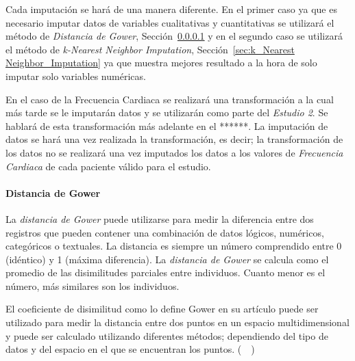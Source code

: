 Cada imputación se hará de una manera diferente. En el primer caso ya que es necesario imputar datos de variables cualitativas y cuantitativas se utilizará el método de \textit{Distancia de Gower}, Sección~\ref{sec:gower_distance} y en el segundo caso se utilizará el método de \textit{k-Nearest Neighbor Imputation}, Sección~\ref{sec:k_Nearest Neighbor_Imputation} ya que muestra mejores resultado a la hora de solo imputar solo variables numéricas.

En el caso de la Frecuencia Cardiaca se realizará una transformación a la cual más tarde se le imputarán datos y se utilizarán como parte del \textit{Estudio 2}. Se hablará de esta transformación más adelante en el ******. La imputación de datos se hará una vez realizada la transformación, es decir; la transformación de los datos no se realizará una vez imputados los datos a los valores de \textit{Frecuencia Cardiaca} de cada paciente válido para el estudio.

\paragraph{Distancia de Gower}\label{sec:gower_distance}

La \textit{distancia de Gower} puede utilizarse para medir la diferencia entre dos registros que pueden contener una combinación de datos lógicos, numéricos, categóricos o textuales. La distancia es siempre un número comprendido entre 0 (idéntico) y 1 (máxima diferencia). La \textit{distancia de Gower} se calcula como el promedio de las disimilitudes parciales entre individuos. Cuanto menor es el número, más similares son los individuos.

El coeficiente de disimilitud como lo define Gower en su artículo puede ser utilizado para medir la distancia entre dos puntos en un espacio multidimensional y puede ser calculado utilizando diferentes métodos; dependiendo del tipo de datos y del espacio en el que se encuentran los puntos. (~\cite{Gower1971}~)

